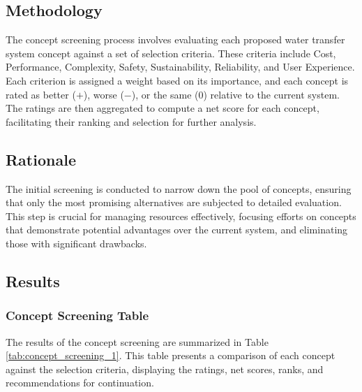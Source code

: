 \documentclass[12pt]{report}
\begin{document}
\subsection{Methodology}
\label{subsec:concept_screening_methodology}

The concept screening process involves evaluating each proposed water transfer system concept against a set of selection criteria. These criteria include Cost, Performance, Complexity, Safety, Sustainability, Reliability, and User Experience. Each criterion is assigned a weight based on its importance, and each concept is rated as better ($+$), worse ($-$), or the same ($0$) relative to the current system. The ratings are then aggregated to compute a net score for each concept, facilitating their ranking and selection for further analysis.

\subsection{Rationale}
\label{subsec:concept_screening_rationale}

The initial screening is conducted to narrow down the pool of concepts, ensuring that only the most promising alternatives are subjected to detailed evaluation. This step is crucial for managing resources effectively, focusing efforts on concepts that demonstrate potential advantages over the current system, and eliminating those with significant drawbacks.

\subsection{Results}
\label{subsec:concept_screening_results}

\subsubsection{Concept Screening Table}
\label{subsubsec:concept_screening_table}

The results of the concept screening are summarized in Table \ref{tab:concept_screening_1}. This table presents a comparison of each concept against the selection criteria, displaying the ratings, net scores, ranks, and recommendations for continuation.
\end{document}
